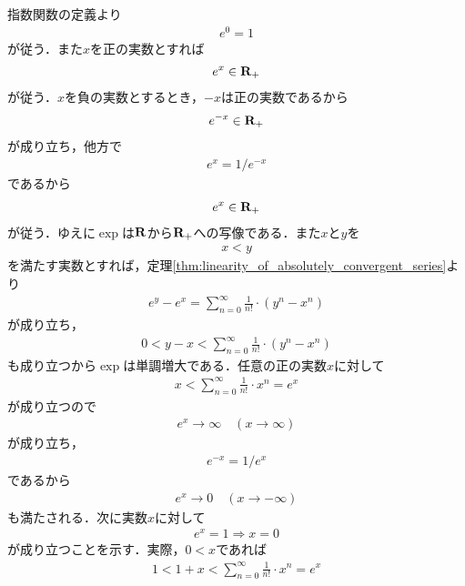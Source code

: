 	\begin{sketch}
		指数関数の定義より
		\begin{align}
			e^0 = 1
		\end{align}
		が従う．また$x$を正の実数とすれば
		\begin{align}
			e^{x} \in \mathbf{R}_+
		\end{align}
		が従う．$x$を負の実数とするとき，$-x$は正の実数であるから
		\begin{align}
			e^{-x} \in \mathbf{R}_+
		\end{align}
		が成り立ち，他方で
		\begin{align}
			e^{x} = 1/e^{-x}
		\end{align}
		であるから
		\begin{align}
			e^{x} \in \mathbf{R}_+
		\end{align}
		が従う．ゆえに$\exp$は$\mathbf{R}$から$\mathbf{R}_+$への写像である．また$x$と$y$を
		\begin{align}
			x < y
		\end{align}
		を満たす実数とすれば，定理\ref{thm:linearity_of_absolutely_convergent_series}より
		\begin{align}
			e^{y} - e^{x} = \sum_{n=0}^{\infty} \frac{1}{n!} \cdot (y^n - x^n) 
		\end{align}
		が成り立ち，
		\begin{align}
			0 < y - x < \sum_{n=0}^{\infty} \frac{1}{n!} \cdot (y^n - x^n) 
		\end{align}
		も成り立つから$\exp$は単調増大である．任意の正の実数$x$に対して
		\begin{align}
			x < \sum_{n=0}^{\infty} \frac{1}{n!} \cdot x^n = e^{x}
		\end{align}
		が成り立つので
		\begin{align}
			e^x \longrightarrow \infty \quad (x \longrightarrow \infty)
		\end{align}
		が成り立ち，
		\begin{align}
			e^{-x} = 1/e^{x}
		\end{align}
		であるから
		\begin{align}
			e^x \longrightarrow 0 \quad (x \longrightarrow -\infty)
		\end{align}
		も満たされる．次に実数$x$に対して
		\begin{align}
			e^x = 1 \Longrightarrow x=0
			\label{fom:thm_real_valued_exponential_function}
		\end{align}
		が成り立つことを示す．実際，$0 < x$であれば
		\begin{align}
			1 < 1 + x < \sum_{n=0}^{\infty} \frac{1}{n!} \cdot x^n = e^{x}

\end{align}
\end{sketch}
